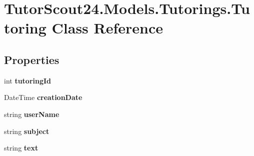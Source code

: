 \hypertarget{class_tutor_scout24_1_1_models_1_1_tutorings_1_1_tutoring}{}\section{Tutor\+Scout24.\+Models.\+Tutorings.\+Tutoring Class Reference}
\label{class_tutor_scout24_1_1_models_1_1_tutorings_1_1_tutoring}
\subsection*{Properties}
\begin{DoxyCompactItemize}
\item 
\mbox{\label{class_tutor_scout24_1_1_models_1_1_tutorings_1_1_tutoring_a8d97c50d2abc4e3c6bd7f776a465b78e}} 
int {\bfseries tutoring\+Id}
\item 
\mbox{\label{class_tutor_scout24_1_1_models_1_1_tutorings_1_1_tutoring_ad01fcbb22b3ea4a02618d9d490d90c3c}} 
Date\+Time {\bfseries creation\+Date}
\item 
\mbox{\label{class_tutor_scout24_1_1_models_1_1_tutorings_1_1_tutoring_a8e49a7123cf84faac32875fe7aeecd38}} 
string {\bfseries user\+Name}
\item 
\mbox{\label{class_tutor_scout24_1_1_models_1_1_tutorings_1_1_tutoring_a9f493e00f61669d2600c61afe2653de4}} 
string {\bfseries subject}
\item 
\mbox{\label{class_tutor_scout24_1_1_models_1_1_tutorings_1_1_tutoring_a097bba8db6034f06cdf601f6c2f2857f}} 
string {\bfseries text}

\end{DoxyCompactItemize}
